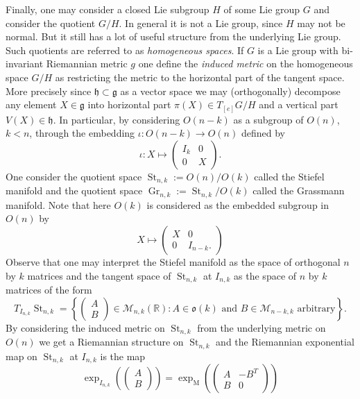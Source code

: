 \documentclass[12pt,a4paper]{article}
\theoremstyle{definition}
\theoremstyle{remark}
\DeclareMathOperator{\St}{St}
\DeclareMathOperator{\Gr}{Gr}
\begin{document}
Finally, one may consider a closed Lie subgroup $H$ of some Lie group $G$ and consider the quotient $G/H$. In general it is not a Lie group, since $H$ may not be normal. But it still has a lot of useful structure from the underlying Lie group. Such quotients are referred to as \textit{homogeneous spaces}. If $G$ is a Lie group with bi-invariant Riemannian metric $g$ one define the \textit{induced metric} on the homogeneous space $G/H$ as restricting the metric to the horizontal part of the tangent space. More precisely since $\mathfrak{h}\subset \mathfrak{g}$ as a vector space we may (orthogonally) decompose any element $X\in \mathfrak{g}$ into horizontal part $\pi(X) \in T_{[e]}G/H$ and a vertical part $V(X)\in \mathfrak{h}$. In particular, by considering $O(n-k)$ as a subgroup of $O(n)$, $k<n$, through the embedding $\iota: O(n-k)\rightarrow O(n)$ defined by
\[
\iota: X \longmapsto \begin{pmatrix}
I_{k} & 0\\ 0 & X
\end{pmatrix}.
\]
One consider the quotient space $\St_{n,k} := O(n)/O(k)$ called the Stiefel manifold and the quotient space $\Gr_{n,k}:=\St_{n,k}/O(k)$ called the Grassmann manifold. Note that here $O(k)$ is considered as the embedded subgroup in $O(n)$ by
\[
X\longmapsto \begin{pmatrix}
X & 0\\ 0 & I_{n-k}.
\end{pmatrix}
\]
Observe that one may interpret the Stiefel manifold as the space of orthogonal $n$ by $k$ matrices and the tangent space of $\St_{n,k}$ at $I_{n,k}$ as the space of $n$ by $k$ matrices of the form
\[
T_{I_{n,k}} \St_{n,k} = \left\{ \begin{pmatrix}
A\\ B
\end{pmatrix} \in \mathcal{M}_{n,k}(\mathbb{R}): A\in \mathfrak{o}(k) \text{ and } B\in \mathcal{M}_{n-k,k} \text{ arbitrary} \right\}.
\]
By considering the induced metric on $\St_{n,k}$ from the underlying metric on $O(n)$ we get a Riemannian structure on $\St_{n,k}$ and the Riemannian exponential map on $\St_{n,k}$ at $I_{n,k}$ is the map
\[
\exp_{I_{n,k}}\left(\begin{pmatrix}
A\\B
\end{pmatrix}\right) = \exp_{\mathrm{M}}\left( \begin{pmatrix}
A &-B^T\\ B & 0
\end{pmatrix}\right)
\]
\end{document}
